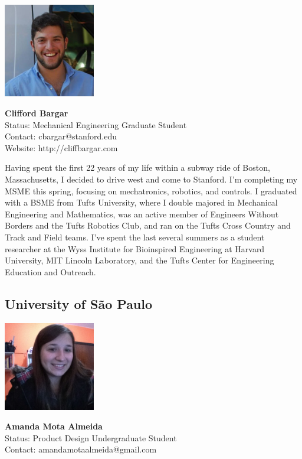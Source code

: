 \noindent \includegraphics[width=40mm]{images/cliff.jpg}
\parbox[b]{0.6\textwidth}{\textbf{Clifford Bargar}\\
Status: Mechanical Engineering Graduate Student\\
Contact: cbargar@stanford.edu \\
Website: http://cliffbargar.com \\
}

Having spent the first 22 years of my life within a subway ride of Boston, Massachusetts, I decided to drive west and come to Stanford. I'm completing my MSME this spring, focusing on mechatronics, robotics, and controls. I graduated with a BSME from Tufts University, where I double majored in Mechanical Engineering and Mathematics, was an active member of Engineers Without Borders and the Tufts Robotics Club, and ran on the Tufts Cross Country and Track and Field teams. I've spent the last several summers as a student researcher at the Wyss Institute for Bioinspired Engineering at Harvard University, MIT Lincoln Laboratory, and the Tufts Center for Engineering Education and Outreach.

\subsection*{University of S\~{a}o Paulo}

\noindent \includegraphics[width=40mm]{images/image013}
\parbox[b]{0.6\textwidth}{\textbf{Amanda Mota Almeida}\\
Status: Product Design Undergraduate Student\\
Contact: amandamotaalmeida@gmail.com \\
}

